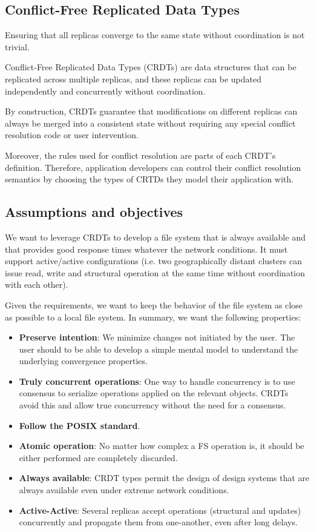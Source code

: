 \documentclass[sigconf,anonymous,10pt]{acmart}
\begin{document}
\subsection{Conflict-Free Replicated Data Types}

Ensuring that all replicas converge to the same state without coordination
is not trivial.

Conflict-Free Replicated Data Types (CRDTs) are data structures that
can be replicated across multiple replicas, and these replicas can be updated independently and concurrently without coordination.

By construction, CRDTs guarantee that modifications on different
replicas can always be merged into a consistent state without requiring
any special conflict resolution code or user intervention.

Moreover, the rules used for conflict resolution are parts of each CRDT's
definition.
Therefore, application developers can control their conflict resolution semantics by
choosing the types of CRTDs they model their application with.

\subsection{Assumptions and objectives}

We want to leverage CRDTs to develop a file system that is always available
and that provides good response times whatever the network conditions.
It must support active/active configurations
(i.e. two geographically distant clusters can issue read, write and structural
operation at the same time without coordination with each other).

Given the requirements, we want to keep the behavior of the file system as
close as possible to a local file system.
In summary, we want the following properties:

\begin{itemize}
	\item \textbf{Preserve intention}: We minimize changes not initiated by the user.
	The user should to be able to develop a simple mental model to understand
	the underlying convergence properties.
	\item \textbf{Truly concurrent operations}: One way to handle concurrency
	is to use consensus to serialize operations applied on the relevant objects.
	CRDTs avoid this and allow true concurrency without the need for
	a consensus.
	\item \textbf{Follow the POSIX standard}.
	\item \textbf{Atomic operation}: No matter how complex a FS operation is,
		  it should be either performed are completely discarded.
	\item \textbf{Always available}: CRDT types permit the design of design systems that
	are always available even under extreme network conditions.
	\item \textbf{Active-Active}: Several replicas accept operations
	(structural and updates) concurrently and propagate them from one-another,
	even after long delays.
\end{itemize}
\end{document}
